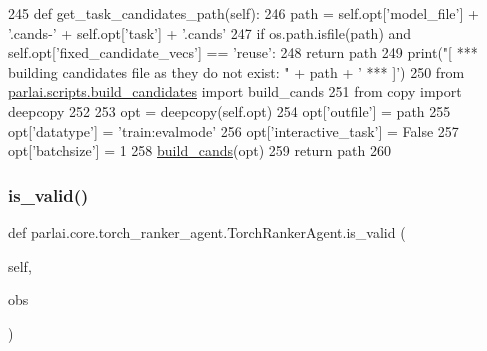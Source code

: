 \begin{DoxyCode}
245     \textcolor{keyword}{def }get\_task\_candidates\_path(self):
246         path = self.opt[\textcolor{stringliteral}{'model\_file'}] + \textcolor{stringliteral}{'.cands-'} + self.opt[\textcolor{stringliteral}{'task'}] + \textcolor{stringliteral}{'.cands'}
247         \textcolor{keywordflow}{if} os.path.isfile(path) \textcolor{keywordflow}{and} self.opt[\textcolor{stringliteral}{'fixed\_candidate\_vecs'}] == \textcolor{stringliteral}{'reuse'}:
248             \textcolor{keywordflow}{return} path
249         print(\textcolor{stringliteral}{"[ *** building candidates file as they do not exist: "} + path + \textcolor{stringliteral}{' *** ]'})
250         \textcolor{keyword}{from} \hyperlink{namespaceparlai_1_1scripts_1_1build__candidates}{parlai.scripts.build\_candidates} \textcolor{keyword}{import} build\_cands
251         \textcolor{keyword}{from} copy \textcolor{keyword}{import} deepcopy
252 
253         opt = deepcopy(self.opt)
254         opt[\textcolor{stringliteral}{'outfile'}] = path
255         opt[\textcolor{stringliteral}{'datatype'}] = \textcolor{stringliteral}{'train:evalmode'}
256         opt[\textcolor{stringliteral}{'interactive\_task'}] = \textcolor{keyword}{False}
257         opt[\textcolor{stringliteral}{'batchsize'}] = 1
258         \hyperlink{namespaceparlai_1_1agents_1_1legacy__agents_1_1memnn_1_1memnn__v0_ab07fdb540c02e8e2a1cc7e8cf662a8b8}{build\_cands}(opt)
259         \textcolor{keywordflow}{return} path
260 
\end{DoxyCode}
\mbox{\label{classparlai_1_1core_1_1torch__ranker__agent_1_1TorchRankerAgent_a3a80c3eb68b019859da2a83706c3844d}} 
\subsubsection{\texorpdfstring{is\+\_\+valid()}{is\_valid()}}
{\footnotesize\ttfamily def parlai.\+core.\+torch\+\_\+ranker\+\_\+agent.\+Torch\+Ranker\+Agent.\+is\+\_\+valid (\begin{DoxyParamCaption}\item[{}]{self,  }\item[{}]{obs }\end{DoxyParamCaption})}

